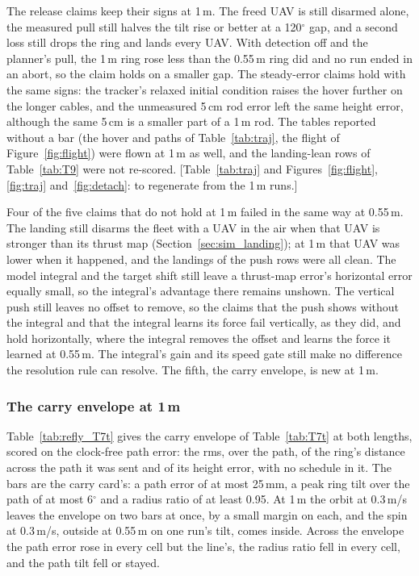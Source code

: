 The release claims keep their signs at 1\,m. The freed UAV is still disarmed alone, the measured pull still halves the
tilt rise or better at a 120$^\circ$ gap, and a second loss still drops the ring and lands every UAV. With detection
off and the planner's pull, the 1\,m ring rose less than the 0.55\,m ring did and no run ended in an abort, so the
claim holds on a smaller gap. The steady-error claims hold with the same signs: the tracker's relaxed initial condition raises
the hover further on the longer cables, and the unmeasured 5\,cm rod error left the same height error, although the same 5\,cm
is a smaller part of a 1\,m rod. The tables reported without a bar (the hover and paths of Table~\ref{tab:traj}, the
flight of Figure~\ref{fig:flight}) were flown at 1\,m as well, and the landing-lean rows of Table~\ref{tab:T9} were not
re-scored. [Table~\ref{tab:traj} and Figures~\ref{fig:flight}, \ref{fig:traj} and~\ref{fig:detach}: to regenerate from
the 1\,m runs.]

Four of the five claims that do not hold at 1\,m failed in the same way at 0.55\,m. The landing still disarms the fleet
with a UAV in the air when that UAV is stronger than its thrust map (Section~\ref{sec:sim_landing}); at 1\,m that UAV
was lower when it happened, and the landings of the push rows were all clean. The model integral and the target shift
still leave a thrust-map error's horizontal error equally small, so the integral's advantage there remains unshown.
The vertical push still leaves no offset to remove, so the claims that the push shows without the integral and that
the integral learns its force fail vertically, as they did, and hold horizontally, where the integral removes the
offset and learns the force it learned at 0.55\,m. The integral's gain and its speed gate still make no difference
the resolution rule can resolve. The fifth, the carry envelope, is new at 1\,m.

\subsubsection{The carry envelope at \texorpdfstring{1\,m}{1 m}}

Table~\ref{tab:refly_T7t} gives the carry envelope of Table~\ref{tab:T7t} at both lengths, scored on the clock-free
path error: the rms, over the path, of the ring's distance across the path it was sent and of its height error, with
no schedule in it. The bars are the carry card's: a path error of at most 25\,mm, a peak ring tilt over the path of at
most 6$^\circ$ and a radius ratio of at least 0.95. At 1\,m the orbit at 0.3\,m/s leaves the envelope on two bars at
once, by a small margin on each, and the spin at 0.3\,m/s, outside at 0.55\,m on one run's tilt, comes inside.
Across the envelope the path error rose in every cell but the line's, the radius ratio fell in every cell, and the
path tilt fell or stayed.

